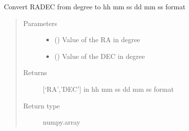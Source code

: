 \documentclass[letterpaper,10pt,english]{sphinxmanual}
\begin{document}
\begin{fulllineitems}
\label{\detokenize{paircars:paircars.basic_func.radec_con_deg_to_hhmmss}}
\sphinxAtStartPar
Convert RA\sphinxhyphen{}DEC from degree to hh mm ss dd mm ss format
\begin{quote}\begin{description}
\item[{Parameters}] \leavevmode\begin{itemize}
\item {} 
\sphinxAtStartPar
{} () \textendash{} Value of the RA in degree

\item {} 
\sphinxAtStartPar
{} () \textendash{} Value of the DEC in degree

\end{itemize}

\item[{Returns}] \leavevmode
\sphinxAtStartPar
{[}‘RA’,’DEC’{]} in hh mm ss dd mm ss format

\item[{Return type}] \leavevmode
\sphinxAtStartPar
numpy.array

\end{description}\end{quote}

\end{fulllineitems}

\end{document}
